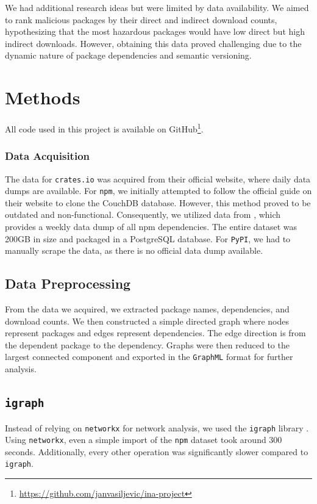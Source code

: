 \documentclass[9pt,twocolumn,twoside]{pnas-report}
\begin{document}
We had additional research ideas but were limited by data availability.
We aimed to rank malicious packages by their direct and indirect download counts, hypothesizing that the most hazardous packages would have low direct but high indirect downloads.
However, obtaining this data proved challenging due to the dynamic nature of package dependencies and semantic versioning.

\small

\section*{Methods}

All code used in this project is available on GitHub\footnote{\url{https://github.com/janvasiljevic/ina-project}}.

\subsubsection*{Data Acquisition} The data for \texttt{crates.io} was acquired from their official website, where daily data dumps are available.
For \texttt{npm}, we initially attempted to follow the official guide on their website to clone the CouchDB database.
However, this method proved to be outdated and non-functional.
Consequently, we utilized data from \cite{npmdata}, which provides a weekly data dump of all npm dependencies.
The entire dataset was 200GB in size and packaged in a PostgreSQL database.
For \texttt{PyPI}, we had to manually scrape the data, as there is no official data dump available.

\subsection*{Data Preprocessing} From the data we acquired, we extracted package names, dependencies, and download counts. We then constructed a simple directed graph where nodes represent packages and edges represent dependencies. The edge direction is from the dependent package to the dependency. Graphs were then reduced to the largest connected component and exported in the \texttt{GraphML} format for further analysis.

\subsection*{\texttt{igraph}} Instead of relying on \texttt{networkx} for network analysis, we used the \texttt{igraph} library \cite{igraph}.
Using \texttt{networkx}, even a simple import of the \texttt{npm} dataset took around 300 seconds.
Additionally, every other operation was significantly slower compared to \texttt{igraph}.
\end{document}
